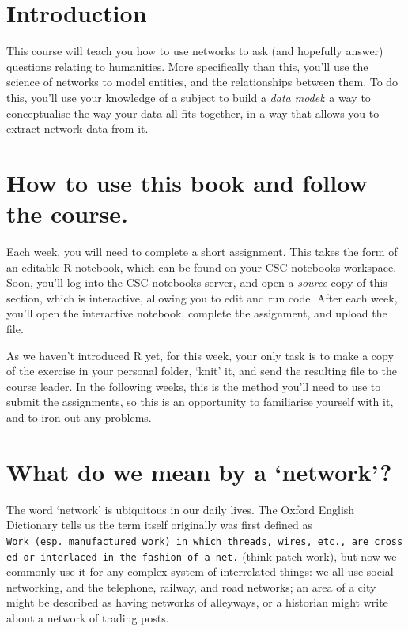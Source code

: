 \documentclass[
]{book}
\begin{document}
\hypertarget{introduction}{%
\section{Introduction}\label{introduction}}

This course will teach you how to use networks to ask (and hopefully answer) questions relating to humanities. More specifically than this, you'll use the science of networks to model entities, and the relationships between them. To do this, you'll use your knowledge of a subject to build a \emph{data model}: a way to conceptualise the way your data all fits together, in a way that allows you to extract network data from it.

\hypertarget{how-to-use-this-book-and-follow-the-course.}{%
\section{How to use this book and follow the course.}\label{how-to-use-this-book-and-follow-the-course.}}

Each week, you will need to complete a short assignment. This takes the form of an editable R notebook, which can be found on your CSC notebooks workspace. Soon, you'll log into the CSC notebooks server, and open a \emph{source} copy of this section, which is interactive, allowing you to edit and run code. After each week, you'll open the interactive notebook, complete the assignment, and upload the file.

As we haven't introduced R yet, for this week, your only task is to make a copy of the exercise in your personal folder, `knit' it, and send the resulting file to the course leader. In the following weeks, this is the method you'll need to use to submit the assignments, so this is an opportunity to familiarise yourself with it, and to iron out any problems.

\hypertarget{what-do-we-mean-by-a-network}{%
\section{What do we mean by a `network'?}\label{what-do-we-mean-by-a-network}}

The word `network' is ubiquitous in our daily lives. The Oxford English Dictionary tells us the term itself originally was first defined as \texttt{Work\ (esp.\ manufactured\ work)\ in\ which\ threads,\ wires,\ etc.,\ are\ crossed\ or\ interlaced\ in\ the\ fashion\ of\ a\ net.} (think patch work), but now we commonly use it for any complex system of interrelated things: we all use social networking, and the telephone, railway, and road networks; an area of a city might be described as having networks of alleyways, or a historian might write about a network of trading posts.
\end{document}
